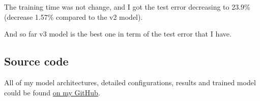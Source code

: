 The training time was not change, and I got the test error decreasing to 23.9\% (decrease 1.57\% compared to the v2 model).

And so far v3 model is the best one in term of the test error that I have.

\subsection{Source code}
All of my model architectures, detailed configurations, results and trained model could be found \href{https://github.com/tlvu2697/image-classification-cifar10}{on my GitHub}.